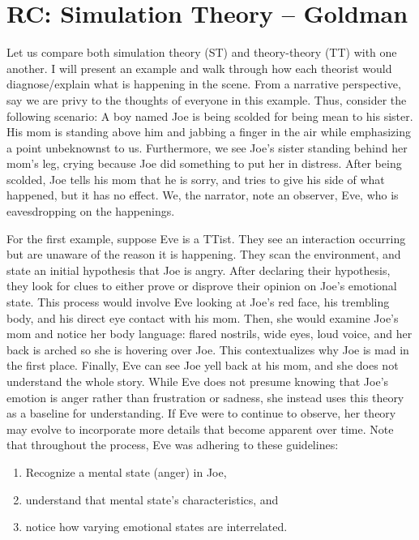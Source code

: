 \documentclass[11pt]{article}
\begin{document}
\section{RC: Simulation Theory -- Goldman}

Let us compare both simulation theory (ST) and theory-theory (TT) with one another. I will present an example and walk through how each theorist would diagnose/explain what is happening in the scene. From a narrative perspective, say we are privy to the thoughts of everyone in this example. Thus, consider the following scenario: A boy named Joe is being scolded for being mean to his sister. His mom is standing above him and jabbing a finger in the air while emphasizing a point unbeknownst to us. Furthermore, we see Joe's sister standing behind her mom's leg, crying because Joe did something to put her in distress. After being scolded, Joe tells his mom that he is sorry, and tries to give his side of what happened, but it has no effect. We, the narrator, note an observer, Eve, who is eavesdropping on the happenings.  

For the first example, suppose Eve is a TTist. They see an interaction occurring but are unaware of the reason it is happening. They scan the environment, and state an initial hypothesis that Joe is angry. After declaring their hypothesis, they look for clues to either prove or disprove their opinion on Joe's emotional state. This process would involve Eve looking at Joe's red face, his trembling body, and his direct eye contact with his mom. Then, she would examine Joe's mom and notice her body language: flared nostrils, wide eyes, loud voice, and her back is arched so she is hovering over Joe. This contextualizes why Joe is mad in the first place. Finally, Eve can see Joe yell back at his mom, and she does not understand the whole story. While Eve does not presume knowing that Joe's emotion is anger rather than frustration or sadness, she instead uses this theory as a baseline for understanding. If Eve were to continue to observe, her theory may evolve to incorporate more details that become apparent over time. Note that throughout the process, Eve was adhering to these guidelines: 

\begin{enumerate}
    \item Recognize a mental state (anger) in Joe,
    \item understand that mental state's characteristics, and
    \item notice how varying emotional states are interrelated.
\end{enumerate}
\end{document}

